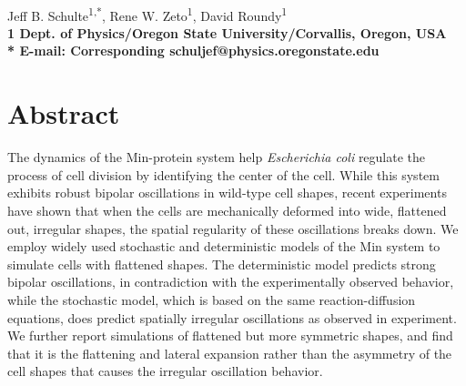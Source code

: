 \documentclass[10pt,letterpaper]{article}
\date{}
\begin{document}
\vspace*{0.35in}

\begin{flushleft}
{\Large
\textbf{}
}
\newline
\\
Jeff B. Schulte\textsuperscript{1,*},
Rene W. Zeto\textsuperscript{1},
David Roundy\textsuperscript{1}
\\
\bf{1} Dept. of Physics/Oregon State University/Corvallis, Oregon, USA
\\

% 
%

* E-mail: Corresponding schuljef@physics.oregonstate.edu
\end{flushleft}
\section*{Abstract}
  The dynamics of the Min-protein system help \emph{Escherichia coli}
  regulate the process of cell division by identifying the center of
  the cell.  While this system exhibits robust bipolar oscillations in
  wild-type cell shapes, recent experiments have shown that when the
  cells are mechanically deformed into wide, flattened out, irregular
  shapes, the spatial regularity of these oscillations breaks down. We
  employ widely used stochastic and deterministic models of the Min
  system to simulate cells with flattened shapes.  The deterministic
  model predicts strong bipolar oscillations, in contradiction with
  the experimentally observed behavior, while the stochastic model,
  which is based on the same reaction-diffusion equations, does
  predict spatially irregular oscillations as observed in experiment.
  We further report simulations of flattened but more symmetric
  shapes, and find that it is the flattening and lateral expansion
  rather than the asymmetry of the cell shapes that causes the
  irregular oscillation behavior.

\end{document}

